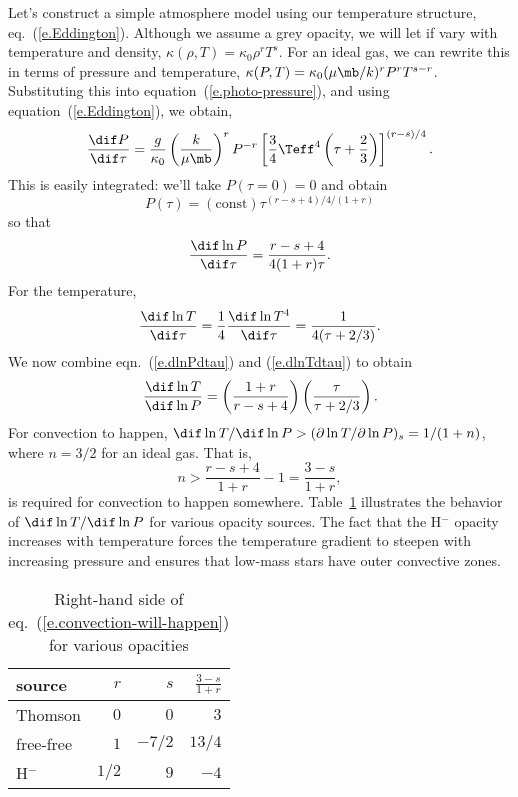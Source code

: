 Let's construct a simple atmosphere model using our temperature structure, eq.~(\ref{e.Eddington}).  Although we assume a grey opacity, we will let if vary with temperature and density, $\kappa(\rho,T) = \kappa_{0}\rho^{r}T^{s}$.  For an ideal gas, we can rewrite this in terms of pressure and temperature, $\kappa(P,T) = \kappa_{0} (\mu\mb/k)^{r}P^{r} T^{s-r}$.  Substituting this into equation~(\ref{e.photo-pressure}), and using equation~(\ref{e.Eddington}), we obtain,
\[
  \frac{\dif P}{\dif \tau} = \frac{g}{\kappa_{0}}\left(\frac{k}{\mu\mb}\right)^{r} P^{-r} \left[\frac{3}{4}\Teff^{4}\left(\tau + \frac{2}{3}\right)\right]^{(r-s)/4}.
\]
This is easily integrated: we'll take $P(\tau = 0) = 0$ and obtain
\[
  P(\tau) = (\mathrm{const})\tau^{(r-s+4)/4/(1+r)}
\]
so that
\begin{equation}\label{e.dlnPdtau}
  \frac{\dif \ln P}{\dif \tau} = \frac{r-s+4}{4(1+r)\tau}.
\end{equation}
For the temperature,
\begin{equation}\label{e.dlnTdtau}
 \frac{\dif\ln T}{\dif\tau} = \frac{1}{4}\frac{\dif\ln T^{4}}{\dif \tau} = \frac{1}{4(\tau + 2/3)}.
\end{equation}
We now combine eqn.~(\ref{e.dlnPdtau}) and (\ref{e.dlnTdtau}) to obtain
\begin{equation}\label{e.dlnTdlnP-atmosphere}
\frac{\dif \ln T}{\dif\ln P} = \left(\frac{1+r}{r-s +4}\right)\left(\frac{\tau}{\tau + 2/3}\right).
\end{equation}
For convection to happen, $\dif\ln T/\dif\ln P > (\partial\ln T/\partial\ln P)_{s} = 1/(1+n)$, where $n = 3/2$ for an ideal gas.  That is,
\begin{equation}\label{e.convection-will-happen}
 n > \frac{r-s + 4}{1+r} - 1 = \frac{3-s}{1+r},
\end{equation}
is required for convection to happen somewhere.  Table~\ref{t.rhs} illustrates the behavior of $\dif\ln T/\dif\ln P$ for various opacity sources.  The fact that the H$^{-}$ opacity increases with temperature forces the temperature gradient to steepen with increasing pressure and ensures that low-mass stars have outer convective zones.

\begin{table}[htbp]
\caption[Requirement for convection in the stellar atmosphere]{Right-hand side of eq.~(\ref{e.convection-will-happen}) for various opacities}
\label{t.rhs}
\begin{center}
\begin{tabular}{lrrr}
\hline
source & $r$ & $s$ & $\frac{3-s}{1+r}$\\
\hline\hline
Thomson & $0$ & $0$ & $3$\\
free-free & $1$ & $-7/2$ & $13/4$\\
H$^{-}$ & $1/2$ & $9$ & $-4$\\
\hline
\end{tabular}
\end{center}
\end{table}

